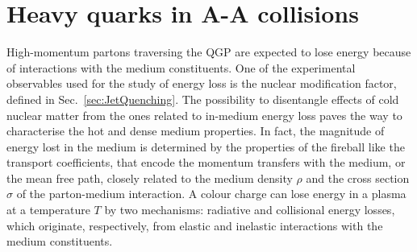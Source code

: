 \section{Heavy quarks in A-A collisions}
\label{sec:HFEnLossinAA}
High-momentum partons traversing the QGP are expected 
to lose energy because of interactions 
with the medium constituents. One of the experimental observables 
used for the study of energy loss is the 
nuclear modification factor, defined in Sec.~\ref{sec:JetQuenching}. 
The possibility to disentangle
effects of cold nuclear matter from the ones related to in-medium 
energy loss paves the way to characterise the 
hot and dense medium properties. In fact, the magnitude of energy lost in the medium is
determined by the properties of the fireball like the transport coefficients,
that encode the momentum transfers with the medium, or the mean free 
path, closely related to the medium density $\rho$
and the cross section $\sigma$ of the parton-medium interaction. 
A colour charge can lose energy in a plasma at a temperature $T$ by two mechanisms: 
radiative and collisional energy losses, which originate, respectively, from elastic
and inelastic interactions with the medium constituents.
